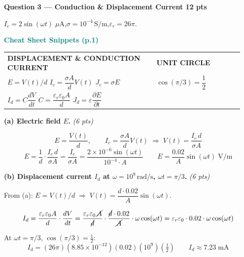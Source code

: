 \documentclass[11pt,letterpaper]{article}
\begin{document}
\newpage
\colorbox{coralbg}{\parbox{\dimexpr\linewidth-2\fboxsep}{\color{coral}\large\textbf{Question 3 --- Conduction \& Displacement Current \hfill 12 pts}}}

\vspace{4pt}
$I_c=2\sin(\omega t)\;\mu\text{A}$,\quad $\sigma=10^{-4}\,\text{S/m}$,\quad $\varepsilon_r=26\pi$.

\begin{cssnip}
\textbf{\small\textcolor{teal}{Cheat Sheet Snippets (p.1)}}\\[3pt]
\begin{tabular}{@{}p{0.60\linewidth}p{0.35\linewidth}@{}}
\textbf{DISPLACEMENT \& CONDUCTION CURRENT} & \textbf{UNIT CIRCLE}\\
$E=V(t)/d$ \quad $I_c=\dfrac{\sigma A}{d}V(t)$ \quad $J_c=\sigma E$ &
$\cos(\pi/3)=\dfrac{1}{2}$\\[5pt]
$I_d=C\dfrac{dV}{dt}$ \quad $C=\dfrac{\varepsilon_r\varepsilon_0 A}{d}$ \quad $J_d=\varepsilon\dfrac{\partial E}{\partial t}$ & \\
\end{tabular}
\end{cssnip}

\textbf{(a) Electric field $E$.} \hfill\textit{(6 pts)}

\[
E = \frac{V(t)}{d},\qquad
I_c = \frac{\sigma A}{d}V(t)
\;\Rightarrow\; V(t) = \frac{I_c\,d}{\sigma A}
\]
\[
E = \frac{1}{d}\cdot\frac{I_c\,d}{\sigma A}
= \frac{I_c}{\sigma A}
= \frac{2\times10^{-6}\sin(\omega t)}{10^{-4}\cdot A}
\qquad
\boxed{E = \frac{0.02}{A}\sin(\omega t)\;\text{V/m}}
\]

\textbf{(b) Displacement current $I_d$ at $\omega=10^9\,\text{rad/s}$, $\omega t=\pi/3$.} \hfill\textit{(6 pts)}

From (a): $E=V(t)/d \;\Rightarrow\; V(t) = \dfrac{d\cdot0.02}{A}\sin(\omega t)$.

\[
I_d = \frac{\varepsilon_r\varepsilon_0 A}{d}\cdot\frac{dV}{dt}
= \frac{\varepsilon_r\varepsilon_0\,\cancel{A}}{\cancel{d}}
  \cdot\frac{\cancel{d}\cdot0.02}{\cancel{A}}\cdot\omega\cos(\omega t)
= \varepsilon_r\varepsilon_0\cdot0.02\cdot\omega\cos(\omega t)
\]

At $\omega t=\pi/3$, $\cos(\pi/3)=\tfrac{1}{2}$:
\[
I_d = (26\pi)(8.85\times10^{-12})(0.02)(10^9)\!\left(\tfrac{1}{2}\right)
\qquad
\boxed{I_d \approx 7.23\;\text{mA}}
\]
\end{document}
